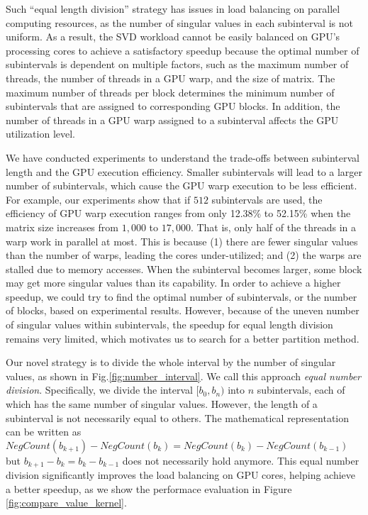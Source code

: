Such ``equal length division'' strategy has issues in load balancing on 
parallel computing resources, as the number of singular values in each
subinterval is not uniform. As a result,
the SVD workload cannot be easily balanced on GPU's processing cores to achieve a satisfactory speedup because the optimal number of subintervals is dependent on multiple factors, such as the maximum number of threads, the number of threads in a GPU warp, and the size of matrix.
The maximum number of threads per block determines the minimum number
of subintervals that are assigned to corresponding GPU blocks.
In addition, the number of threads in a GPU warp assigned to a subinterval affects the GPU utilization level.

We have conducted experiments to understand the trade-offs between subinterval length and the GPU execution efficiency. 
Smaller subintervals will lead to a larger number of subintervals, which cause the GPU warp execution to be less efficient. 
For example, our experiments show that if $512$ subintervals are used, the efficiency of GPU warp execution ranges from only 12.38\% to 52.15\% when the matrix size increases from $1,000$ to $17,000$.
That is, only half of the threads in a warp work in parallel at most. This is because  (1)
 there are fewer singular values than the number of warps, leading the cores under-utilized; and 
(2) the warps are stalled due to memory accesses.
{\color{red}When the subinterval becomes larger, some block may get more singular values than its capability.}
In order to achieve a higher speedup, we could try to find the optimal number of subintervals, or the number of blocks, based on experimental results. 
However, because of the uneven number of singular values within subintervals, the speedup for equal length division remains very limited, which motivates us to search for a better partition method.

Our novel strategy is to divide the whole interval by the number of singular values, as shown in Fig.\ref{fig:number_interval}. We call this approach {\it equal number division}. 
Specifically, we divide the interval $[b_0,b_n)$ into $n$ subintervals, each of which has the same number of singular values. 
However, the length of a subinterval is not necessarily equal to others.
The mathematical representation can be written as $NegCount(b_{k+1})-NegCount(b_{k})=NegCount(b_{k})-NegCount(b_{k-1})$ but $b_{k+1}-b_k = b_{k}-b_{k-1}$ does not necessarily hold anymore.
This equal number division significantly improves the load balancing on GPU cores, helping achieve a better speedup, as we show the performace evaluation in Figure \ref{fig:compare_value_kernel}.

